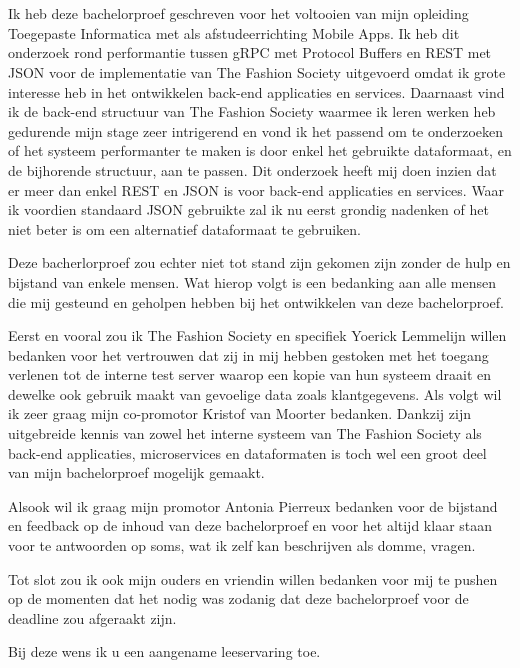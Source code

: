 
\chapter*{}
\label{ch:voorwoord}
Ik heb deze bachelorproef geschreven voor het voltooien van mijn opleiding Toegepaste Informatica met als afstudeerrichting Mobile Apps. Ik heb dit onderzoek rond performantie tussen gRPC met Protocol Buffers en REST met JSON voor de implementatie van The Fashion Society uitgevoerd omdat ik grote interesse heb in het ontwikkelen back-end applicaties en services. Daarnaast vind ik de back-end structuur van The Fashion Society waarmee ik leren werken heb gedurende mijn stage zeer intrigerend en vond ik het passend om te onderzoeken of het systeem performanter te maken is door enkel het gebruikte dataformaat, en de bijhorende structuur, aan te passen.
Dit onderzoek heeft mij doen inzien dat er meer dan enkel REST en JSON is voor back-end applicaties en services. Waar ik voordien standaard JSON gebruikte zal ik nu eerst grondig nadenken of het niet beter is om een alternatief dataformaat te gebruiken.

Deze bacherlorproef zou echter niet tot stand zijn gekomen zijn zonder de hulp en bijstand van enkele mensen. Wat hierop volgt is een bedanking aan alle mensen die mij gesteund en geholpen hebben bij het ontwikkelen van deze bachelorproef.
 
Eerst en vooral zou ik The Fashion Society en specifiek Yoerick Lemmelijn willen bedanken voor het vertrouwen dat zij in mij hebben gestoken met het toegang verlenen tot de interne test server waarop een kopie van hun systeem draait en dewelke ook gebruik maakt van gevoelige data zoals klantgegevens. Als volgt wil ik zeer graag mijn co-promotor Kristof van Moorter bedanken. Dankzij zijn uitgebreide kennis van zowel het interne systeem van The Fashion Society als back-end applicaties, microservices en dataformaten is toch wel een groot deel van mijn bachelorproef mogelijk gemaakt.

Alsook wil ik graag mijn promotor Antonia Pierreux bedanken voor de bijstand en feedback op de inhoud van deze bachelorproef en voor het altijd klaar staan voor te antwoorden op soms, wat ik zelf kan beschrijven als domme, vragen.

Tot slot zou ik ook mijn ouders en vriendin willen bedanken voor mij te pushen op de momenten dat het nodig was zodanig dat deze bachelorproef voor de deadline zou afgeraakt zijn.

Bij deze wens ik u een aangename leeservaring toe.

